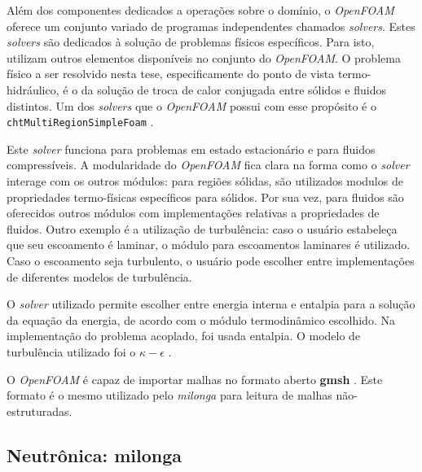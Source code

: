 Além dos componentes dedicados a operações sobre o domínio, o \textit{OpenFOAM} oferece um conjunto variado
de programas independentes chamados \textit{solvers}. Estes \textit{solvers} são dedicados à solução de
problemas físicos específicos. Para isto, utilizam outros elementos disponíveis no conjunto do
\textit{OpenFOAM}. O problema físico a ser resolvido nesta tese, especificamente do ponto de vista
termo-hidráulico, é o da solução de troca de calor conjugada entre sólidos e
fluidos distintos. Um dos \textit{solvers} que o \textit{OpenFOAM} possui com esse propósito é o
\texttt{chtMultiRegionSimpleFoam} \cite{OpenFOAM2015}.

Este \textit{solver} funciona para problemas em estado estacionário e para
fluidos compressíveis. A modularidade do \textit{OpenFOAM}
fica clara na forma como o \textit{solver} interage com os outros módulos: para regiões sólidas,
são utilizados modulos de propriedades termo-físicas específicos para sólidos. Por sua vez, para
fluidos são oferecidos outros módulos com implementações relativas a propriedades de fluidos.
Outro exemplo é a utilização de turbulência: caso o usuário estabeleça que seu escoamento é laminar,
o módulo para escoamentos laminares é utilizado. Caso o escoamento seja turbulento, o usuário pode
escolher entre implementações de diferentes modelos de turbulência.

O \textit{solver} utilizado permite escolher entre energia interna e entalpia para a solução
da equação da energia, de acordo com o módulo termodinâmico escolhido. Na implementação do
problema acoplado, foi usada entalpia. O modelo de turbulência utilizado foi o $\kappa-\epsilon$
\cite{Launder1974}.


O \textit{OpenFOAM} é capaz de importar malhas no formato aberto \textbf{gmsh} \cite{Geuzane2009}. Este
formato é o mesmo utilizado pelo \textit{milonga} para leitura de malhas não-estruturadas.




\subsection{Neutrônica: \textbf{milonga}}
\label{subs:milonga}

